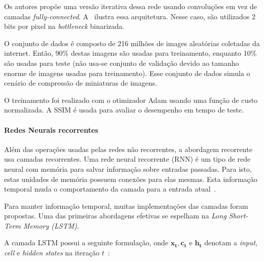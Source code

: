 Os autores propõe uma versão iterativa dessa rede usando convoluções em vez de camadas \textit{fully-connected}. A~ ilustra essa arquitetura. Nesse caso, são utilizados 2 bits por pixel na \textit{bottleneck} binarizada.


O conjunto de dados é composto de 216 milhões de images aleatórias coletadas da internet. Então, 90\% destas imagens são usadas para treinamento, enquanto 10\% são usadas para teste (não usa-se conjunto de validação devido ao tamanho enorme de imagens usadas para treinamento). Esse conjunto de dados simula o cenário de compressão de miniaturas de imagens.

O treinamento foi realizado com o otimizador Adam usando uma função de custo normalizada. A \acrshort{SSIM} é usada para avaliar o desempenho em tempo de teste. 

\paragraph{Redes Neurais recorrentes\\}
Além das operações usadas pelas redes não recorrentes, a abordagem recorrente usa camadas recorrentes. Uma rede neural recorrente (\acrshort{RNN}) é um tipo de rede neural com memória para salvar informação sobre entradas passadas. Para isto, estas unidades de memória possuem conexões para elas mesmas. Esta informação temporal muda o comportamento da camada para a entrada atual~\cite{csvt2019}.

Para manter informação temporal, muitas implementações das camadas foram propostas. Uma das primeiras abordagens efetivas se espelham na \textit{Long Short-Term Memory (\acrshort{LSTM})}.

A camada \acrshort{LSTM} possui a seguinte formulação, onde $\mathbf{x_t}, \mathbf{c_t} \textrm{ e } \mathbf{h_t}$ denotam a \textit{input}, \textit{cell} e \textit{hidden states} na iteração $t$~\cite{toderici2017}:


